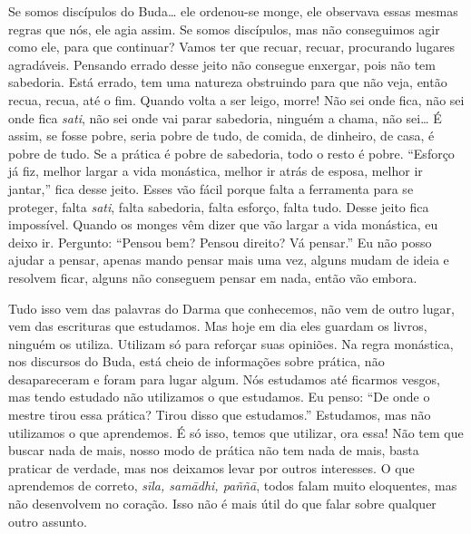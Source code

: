 Se somos discípulos do Buda\ldots{} ele ordenou-se monge, ele observava
essas mesmas regras que nós, ele agia assim. Se somos discípulos, mas
não conseguimos agir como ele, para que continuar? Vamos ter que
recuar, recuar, procurando lugares agradáveis. Pensando errado desse
jeito não consegue enxergar, pois não tem sabedoria. Está errado, tem
uma natureza obstruindo para que não veja, então recua, recua, até o
fim. Quando volta a ser leigo, morre! Não sei onde fica, não sei onde
fica \emph{sati}, não sei onde vai parar sabedoria, ninguém a chama,
não sei\ldots{} É assim, se fosse pobre, seria pobre de tudo, de comida, de
dinheiro, de casa, é pobre de tudo. Se a prática é pobre de sabedoria,
todo o resto é pobre. “Esforço já fiz, melhor largar a vida monástica,
melhor ir atrás de esposa, melhor ir jantar,” fica desse jeito. Esses
vão fácil porque falta a ferramenta para se proteger, falta
\emph{sati}, falta sabedoria, falta esforço, falta tudo. Desse jeito
fica impossível. Quando os monges vêm dizer que vão largar a vida
monástica, eu deixo ir. Pergunto: “Pensou bem? Pensou direito? Vá
pensar.” Eu não posso ajudar a pensar, apenas mando pensar mais uma
vez, alguns mudam de ideia e resolvem ficar, alguns não conseguem
pensar em nada, então vão embora. 

Tudo isso vem das palavras do Darma que conhecemos, não vem de outro
lugar, vem das escrituras que estudamos. Mas hoje em dia eles guardam
os livros, ninguém os utiliza. Utilizam só para reforçar suas opiniões.
Na regra monástica, nos discursos do Buda, está cheio de informações
sobre prática, não desapareceram e foram para lugar algum. Nós
estudamos até ficarmos vesgos, mas tendo estudado não utilizamos o que
estudamos. Eu penso: “De onde o mestre tirou essa prática? Tirou disso
que estudamos.” Estudamos, mas não utilizamos o que aprendemos. É só
isso, temos que utilizar, ora essa! Não tem que buscar nada de mais,
nosso modo de prática não tem nada de mais, basta praticar de verdade,
mas nos deixamos levar por outros interesses. O que aprendemos de
correto, \emph{sīla, samādhi, paññā}, todos falam muito
eloquentes, mas não desenvolvem no coração. Isso não é mais útil do que
falar sobre qualquer outro assunto. 

